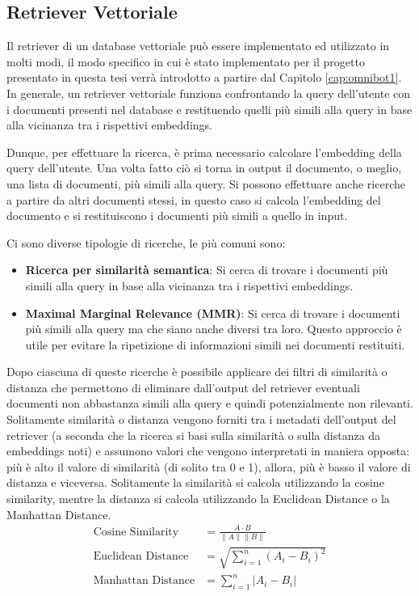 \subsection{Retriever Vettoriale}
Il retriever di un database vettoriale può essere implementato ed utilizzato in molti modi, il modo specifico in cui è stato implementato per il progetto presentato in questa tesi verrà introdotto a partire dal Capitolo \ref{cap:omnibot1}. In generale, un retriever vettoriale funziona confrontando la query dell'utente con i documenti presenti nel database e restituendo quelli più simili alla query in base alla vicinanza tra i rispettivi embeddings.

Dunque, per effettuare la ricerca, è prima necessario calcolare l'embedding della query dell'utente. Una volta fatto ciò si torna in output il documento, o meglio, una lista di documenti, più simili alla query. Si possono effettuare anche ricerche a partire da altri documenti stessi, in questo caso si calcola l'embedding del documento e si restituiscono i documenti più simili a quello in input.

Ci sono diverse tipologie di ricerche, le più comuni sono:
\begin{itemize}
    \item \textbf{Ricerca per similarità semantica}: Si cerca di trovare i documenti più simili alla query in base alla vicinanza tra i rispettivi embeddings.
    \item \textbf{Maximal Marginal Relevance (MMR)}: Si cerca di trovare i documenti più simili alla query ma che siano anche diversi tra loro. Questo approccio è utile per evitare la ripetizione di informazioni simili nei documenti restituiti.
\end{itemize}
Dopo ciascuna di queste ricerche è possibile applicare dei filtri di similarità o distanza che permettono di eliminare dall'output del retriever eventuali documenti non abbastanza simili alla query e quindi potenzialmente non rilevanti. Solitamente similarità o distanza vengono forniti tra i metadati dell'output del retriever (a seconda che la ricerca si basi sulla similarità o sulla distanza da embeddings noti) e assumono valori che vengono interpretati in maniera opposta: più è alto il valore di similarità (di solito tra 0 e 1), allora, più è basso il valore di distanza e viceversa. Solitamente la similarità si calcola utilizzando la cosine similarity, mentre la distanza si calcola utilizzando la Euclidean Distance o la Manhattan Distance.
\begin{align*}
    \text{Cosine Similarity} &= \frac{A \cdot B}{\|A\| \|B\|} \\
    \text{Euclidean Distance} &= \sqrt{\sum_{i=1}^{n} (A_i - B_i)^2} \\
    \text{Manhattan Distance} &= \sum_{i=1}^{n} |A_i - B_i|
\end{align*}


